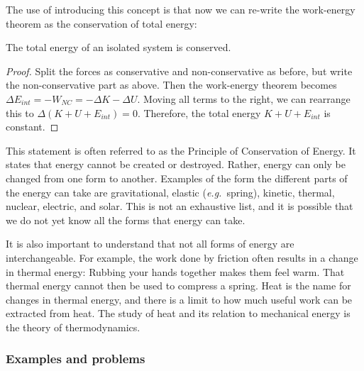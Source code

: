 The use of introducing this concept is that now we can re-write the work-energy theorem as the conservation of total energy:
\begin{theorem}
The total energy of an isolated system is conserved. 
\end{theorem}
\begin{proof}
Split the forces as conservative and non-conservative as before, but write the non-conservative part as above. Then the work-energy theorem becomes $ΔE_{int} = - W_{NC} = -ΔK - ΔU$.
Moving all terms to the right, we can rearrange this to $Δ(K+U+E_{int}) = 0$. Therefore, the total energy $K+U+E_{int}$ is constant. 
\end{proof}

This statement is often referred to as the Principle of Conservation of Energy. It states that energy cannot be created or destroyed. Rather, energy can only be changed from one form to another. Examples of the form the different parts of the energy can take are gravitational, elastic ({\it e.g.}\ spring), kinetic, thermal, nuclear, electric, and solar. This is not an exhaustive list, and it is possible that we do not yet know all the forms that energy can take.

It is also important to understand that not all forms of energy are interchangeable. For example, the work done by friction often results in a change in thermal energy: Rubbing your hands together makes them feel warm. That thermal energy cannot then be used to compress a spring. Heat is the name for changes in thermal energy, and there is a limit to how much useful work can be extracted from heat. 
The study of heat and its relation to mechanical energy is the theory of thermodynamics. 

\subsubsection{Examples and problems}

